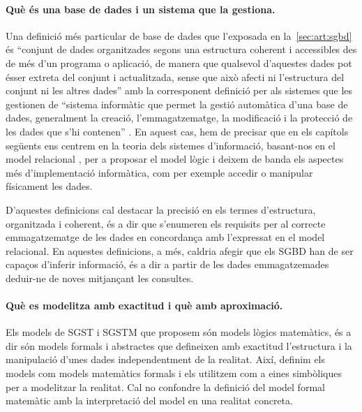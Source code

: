 \paragraph{Què és una base de dades i un sistema que la gestiona.}
Una definició més particular de base de dades que l'exposada en
la~\autoref{sec:art:sgbd} és ``conjunt de dades organitzades segons
una estructura coherent i accessibles des de més d'un programa o
aplicació, de manera que qualsevol d'aquestes dades pot ésser extreta
del conjunt i actualitzada, sense que això afecti ni l'estructura del
conjunt ni les altres dades'' \parencite[s.~v.~base de dades]{termcat}
amb la corresponent definició per als sistemes que les gestionen de
``sistema informàtic que permet la gestió automàtica d'una base de
dades, generalment la creació, l'emmagatzematge, la modificació i la
protecció de les dades que s'hi contenen'' \parencite[s.~v.~sistema de
gestió de bases de dades]{termcat}.  En aquest cas, hem de precisar
que en els capítols següents ens centrem en la teoria dels sistemes
d'informació, basant-nos en el model
relacional \parencite{date04:introduction8}, per a proposar el model
lògic i deixem de banda els aspectes més d'implementació informàtica,
com per exemple accedir o manipular físicament les dades.

D'aquestes definicions cal destacar la precisió en els termes
d'estructura, organitzada i coherent, és a dir que s'enumeren els
requisits per al correcte emmagatzematge de les dades en concordança
amb l'expressat en el model relacional.  En aquestes definicions, a
més, caldria afegir que els \gls{SGBD} han de ser capaços d'inferir
informació, és a dir a partir de les dades emmagatzemades deduir-ne de
noves mitjançant les consultes.





\paragraph{Què es modelitza amb exactitud i què amb aproximació.}
Els models de \gls{SGST} i \gls{SGSTM} que proposem són models lògics
matemàtics, és a dir són models formals i abstractes que defineixen
amb exactitud l'estructura i la manipulació d'unes dades
independentment de la realitat.  
Així, definim els models com models matemàtics formals i els utilitzem
com a eines simbòliques per a modelitzar la
realitat.%
Cal no confondre la definició
del model formal matemàtic amb la interpretació del model en una
realitat concreta.

